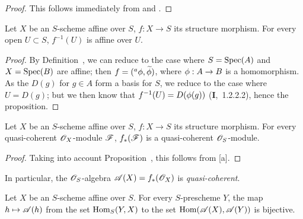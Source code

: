 \begin{proof}
This follows immediately from  and .
\end{proof}

\begin{proposition}[1.2.5]
\label{II.1.2.5}
Let $X$ be an $S$-scheme affine over $S$, $f:X\to S$ its structure morphism.
For every open $U\subset S$, $f^{-1}(U)$ is affine over $U$.
\end{proposition}

\begin{proof}
By Definition~, we can reduce to the case where $S=\operatorname{Spec}(A)$ and $X=\operatorname{Spec}(B)$ are affine; then $f=({}^a\phi,\widetilde{\phi})$, where $\vphi:A\to B$ is a homomorphism.
As the $D(g)$ for $g\in A$ form a basis for $S$, we reduce to the case where $U=D(g)$; but we then know that $f^{-1}(U)=D(\phi(g))$ (\textbf{I},~1.2.2.2), hence the proposition.
\end{proof}

\begin{proposition}[1.2.6]
\label{II.1.2.6}
Let $X$ be an $S$-scheme affine over $S$, $f:X\to S$ its structure morphism.
For every quasi-coherent $\mathscr{O}_X$-module $\mathscr{F}$, $f_*(\mathscr{F})$ is a quasi-coherent $\mathscr{O}_S$-module.
\end{proposition}

\begin{proof}
Taking into account Proposition~, this follows from [a].
\end{proof}

In particular, the $\mathscr{O}_S$-algebra $\mathscr{A}(X)=f_*(\mathscr{O}_X)$ is \emph{quasi-coherent}.

\begin{proposition}[1.2.7]
\label{II.1.2.7}
Let $X$ be an $S$-scheme affine over $S$.
For every $S$-prescheme $Y$, the map $h\mapsto\sh{A}(h)$ from the set $\operatorname{Hom}_S(Y,X)$ to the set $\operatorname{Hom}(\mathscr{A}(X),\mathscr{A}(Y))$  is bijective.
\end{proposition}

